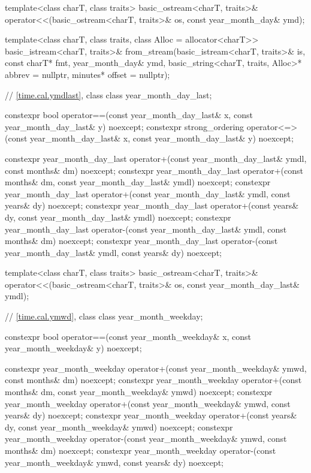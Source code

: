 \begin{codeblock}
{{    template<class charT, class traits>
      basic_ostream<charT, traits>&
        operator<<(basic_ostream<charT, traits>& os, const year_month_day& ymd);

    template<class charT, class traits, class Alloc = allocator<charT>>
      basic_istream<charT, traits>&
        from_stream(basic_istream<charT, traits>& is, const charT* fmt,
                    year_month_day& ymd,
                    basic_string<charT, traits, Alloc>* abbrev = nullptr,
                    minutes* offset = nullptr);

    // \ref{time.cal.ymdlast}, class 
    class year_month_day_last;

    constexpr bool operator==(const year_month_day_last& x,
                              const year_month_day_last& y) noexcept;
    constexpr strong_ordering operator<=>(const year_month_day_last& x,
                                          const year_month_day_last& y) noexcept;

    constexpr year_month_day_last
      operator+(const year_month_day_last& ymdl, const months& dm) noexcept;
    constexpr year_month_day_last
      operator+(const months& dm, const year_month_day_last& ymdl) noexcept;
    constexpr year_month_day_last
      operator+(const year_month_day_last& ymdl, const years& dy) noexcept;
    constexpr year_month_day_last
      operator+(const years& dy, const year_month_day_last& ymdl) noexcept;
    constexpr year_month_day_last
      operator-(const year_month_day_last& ymdl, const months& dm) noexcept;
    constexpr year_month_day_last
      operator-(const year_month_day_last& ymdl, const years& dy) noexcept;

    template<class charT, class traits>
      basic_ostream<charT, traits>&
        operator<<(basic_ostream<charT, traits>& os, const year_month_day_last& ymdl);

    // \ref{time.cal.ymwd}, class 
    class year_month_weekday;

    constexpr bool operator==(const year_month_weekday& x,
                              const year_month_weekday& y) noexcept;

    constexpr year_month_weekday
      operator+(const year_month_weekday& ymwd, const months& dm) noexcept;
    constexpr year_month_weekday
      operator+(const months& dm, const year_month_weekday& ymwd) noexcept;
    constexpr year_month_weekday
      operator+(const year_month_weekday& ymwd, const years& dy) noexcept;
    constexpr year_month_weekday
      operator+(const years& dy, const year_month_weekday& ymwd) noexcept;
    constexpr year_month_weekday
      operator-(const year_month_weekday& ymwd, const months& dm) noexcept;
    constexpr year_month_weekday
      operator-(const year_month_weekday& ymwd, const years& dy) noexcept;

}}
\end{codeblock}
